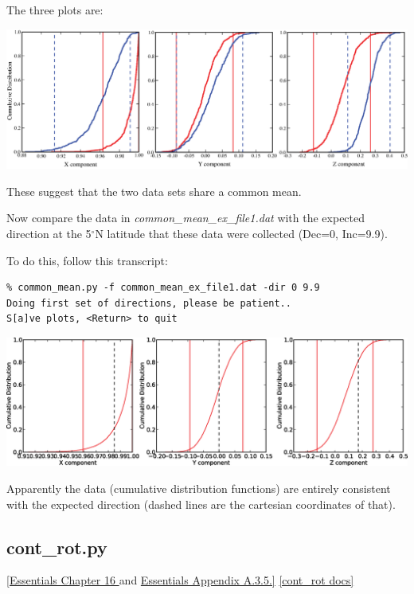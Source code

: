 \documentclass[11pt]{book}
\begin{document}
{{{\noindent The three plots are:

{ %
  \includegraphics[width=15cm]{EPSfiles/common-mean.eps}}

These suggest that  the two data sets share a common mean.  

Now compare the data in  {\it common\_mean\_ex\_file1.dat }  with the expected direction at the 5$^{\circ}$N latitude that these data were collected (Dec=0, Inc=9.9).   

To do this,  follow this transcript:

\begin{verbatim}
% common_mean.py -f common_mean_ex_file1.dat -dir 0 9.9
Doing first set of directions, please be patient..
S[a]ve plots, <Return> to quit
\end{verbatim}

{%
  \includegraphics[width=15cm]{EPSfiles/common-mean-EX.eps}}

Apparently the data (cumulative distribution functions) are entirely consistent with the expected direction (dashed lines are the cartesian coordinates of that).   

\subsection{cont\_rot.py} 
\href{http://magician.ucsd.edu/Essentials_2/WebBook2ch16.html#ch16}{[Essentials Chapter 16 }and \href{http://magician.ucsd.edu/Essentials_2/WebBook2ap1.html#polerot}{Essentials Appendix A.3.5.]}
\href{http://earthref.org/PmagPy/pmagpydocs/cont_rot-module.html}{[cont\_rot docs]}

}}}
\end{document}

